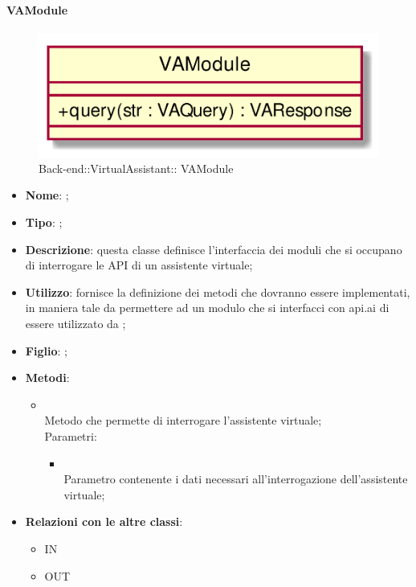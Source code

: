 \hypertarget{ VAModule_label}{\paragraph{ VAModule}}
\begin{figure}[h]
	\centering
	\includegraphics[width=\textwidth,height=\textheight,keepaspectratio]{images/Class_VAModule.png}
	\caption{Back-end::VirtualAssistant:: VAModule}
\end{figure}
\begin{itemize}
	\item \textbf{Nome}: ;
	\item \textbf{Tipo}: ;
	\item \textbf{Descrizione}: questa classe definisce l'interfaccia dei moduli che si occupano di interrogare le API di un assistente virtuale;
	\item \textbf{Utilizzo}: fornisce la definizione dei metodi che dovranno essere implementati, in maniera tale da permettere ad un modulo che si interfacci con api.ai di essere utilizzato da ;
	\item \textbf{Figlio}: ;
	\item \textbf{Metodi}:
	\begin{itemize}
		\item[]  \\
		Metodo che permette di interrogare l'assistente virtuale;\\
		Parametri:
		\begin{itemize}
			\item {} \\
			Parametro contenente i dati necessari all'interrogazione dell'assistente virtuale;
		\end{itemize}
	\end{itemize}
	\item \textbf{Relazioni con le altre classi}:
	\begin{itemize}
		\item IN \hyperlink{VAService_label}{}
		\item OUT \hyperlink{VAQuery_label}{}
	\end{itemize}
\end{itemize}
\FloatBarrier

